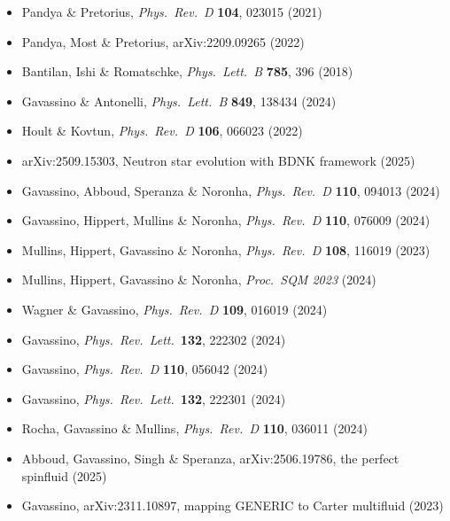 \begin{itemize}
  \item Pandya \& Pretorius, \textit{Phys.\ Rev.\ D} \textbf{104},
    023015 (2021) \citep{PandyaPretorius2021}
  \item Pandya, Most \& Pretorius, arXiv:2209.09265 (2022)
    \citep{PandyaMostPretorius2022ideal}
  \item Bantilan, Ishi \& Romatschke, \textit{Phys.\ Lett.\ B}
    \textbf{785}, 396 (2018) \citep{BantilanIshiRomatschke2018}
  \item Gavassino \& Antonelli, \textit{Phys.\ Lett.\ B} \textbf{849},
    138434 (2024) \citep{GavassinoAntonelli2024}
  \item Hoult \& Kovtun, \textit{Phys.\ Rev.\ D} \textbf{106},
    066023 (2022) \citep{HoultKovtun2022kinetic}
  \item arXiv:2509.15303, Neutron star evolution with BDNK framework
    (2025) \citep{NSevolutionBDNK2025}
  \item Gavassino, Abboud, Speranza \& Noronha, \textit{Phys.\ Rev.\ D}
    \textbf{110}, 094013 (2024) \citep{GavassinoInfoCurrentBDNK2024}
  \item Gavassino, Hippert, Mullins \& Noronha, \textit{Phys.\ Rev.\ D}
    \textbf{110}, 076009 (2024) \citep{GavassinoBDNKFluctuations2024}
  \item Mullins, Hippert, Gavassino \& Noronha, \textit{Phys.\ Rev.\ D}
    \textbf{108}, 116019 (2023) \citep{MullinsHippertGavassinoNoronha2024}
  \item Mullins, Hippert, Gavassino \& Noronha, \textit{Proc.\ SQM 2023}
    (2024) \citep{MullinsGavassinoStochastic2024}
  \item Wagner \& Gavassino, \textit{Phys.\ Rev.\ D} \textbf{109},
    016019 (2024) \citep{WagnerGavassinoRegime2024}
  \item Gavassino, \textit{Phys.\ Rev.\ Lett.}\ \textbf{132}, 222302
    (2024) \citep{GavassinoInfiniteOrder2024}
  \item Gavassino, \textit{Phys.\ Rev.\ D} \textbf{110}, 056042
    (2024) \citep{GavassinoConvergence2024}
  \item Gavassino, \textit{Phys.\ Rev.\ Lett.}\ \textbf{132}, 222301
    (2024) \citep{GavassinoGapless2024}
  \item Rocha, Gavassino \& Mullins, \textit{Phys.\ Rev.\ D}
    \textbf{110}, 036011 (2024) \citep{RochaGavassinoFluctu2024}
  \item Abboud, Gavassino, Singh \& Speranza, arXiv:2506.19786,
    the perfect spinfluid (2025) \citep{AbboudGavassinoSinghSperanzaSpinfluid2025}
  \item Gavassino, arXiv:2311.10897, mapping GENERIC to Carter multifluid
    (2023) \citep{GavassinoGENERICCarter2023}
\end{itemize}

